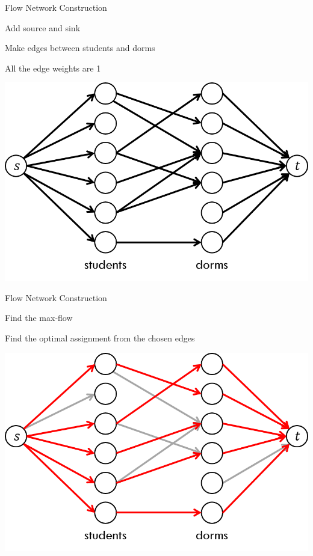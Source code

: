 \documentclass[13pt,onlymath]{beamer}
\begin{document}
\begin{frame}{Flow Network Construction}
\BIT
\item Add source and sink
\item Make edges between students and dorms
\BIT
\item All the edge weights are 1
\EIT \EIT
\begin{center}
\includegraphics[height=0.5\textheight]{figures/bimatching_construction1}
\end{center}
\end{frame}

\begin{frame}{Flow Network Construction}
\BIT
\item Find the max-flow
\item Find the optimal assignment from the chosen edges
\EIT
\begin{center}
\includegraphics[height=0.5\textheight]{figures/bimatching_construction2}
\end{center}
\end{frame}
\end{document}
